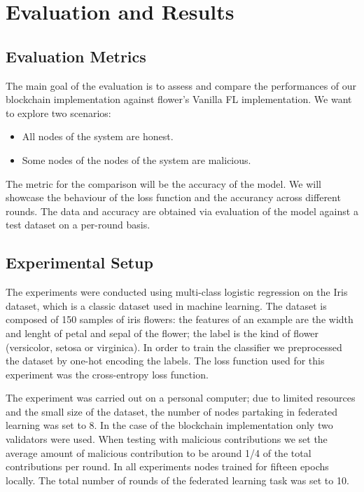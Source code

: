 \section{Evaluation and Results}\label{chap:evaluation}

\subsection{Evaluation Metrics}
The main goal of the evaluation is to assess and compare the performances of our blockchain implementation
against flower's Vanilla FL implementation.
We want to explore two scenarios:
\begin{itemize}
  \item All nodes of the system are honest.
  \item Some nodes of the nodes of the system are malicious.
\end{itemize}

The metric for the comparison will be the accuracy of the model. We will showcase the behaviour of the loss
function and the accurancy across different rounds. The data and accuracy are obtained via evaluation of the
model against a test dataset on a per-round basis.

\subsection{Experimental Setup}
The experiments were conducted using multi-class logistic regression on the Iris dataset, which is a classic
dataset used in machine learning.
The dataset is composed of 150 samples of iris flowers: the features of an example are the width and lenght
of petal and sepal of the flower; the label is the kind of flower (versicolor, setosa or virginica).
In order to train the classifier we preprocessed the dataset by one-hot encoding the labels.
The loss function used for this experiment was the cross-entropy loss function.

The experiment was carried out on a personal computer; due to limited resources and the small size of the
dataset, the number of nodes partaking in federated learning was set to 8.
In the case of the blockchain implementation only two validators were used. When testing with malicious
contributions we set the average amount of malicious contribution to be around 1/4 of the total contributions per round.
In all experiments nodes trained for fifteen epochs locally. The total number of rounds of the federated
learning task was set to 10.


